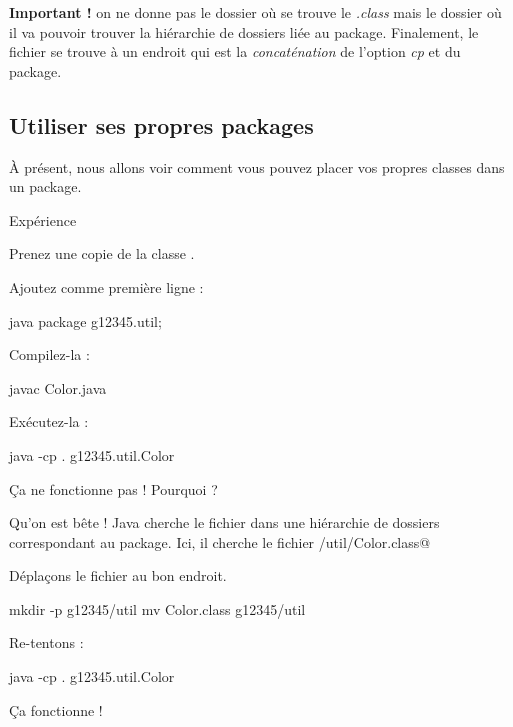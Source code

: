 \documentclass[a4paper,11pt]{article}
\begin{document}
           	 \par
        			\textbf{Important ! } on ne donne pas le dossier o\`u se trouve le \textit{.class}
			mais le dossier o\`u il va pouvoir trouver la hi\'erarchie de dossiers li\'ee au package.
			Finalement, le fichier se trouve \`a un endroit qui est la \textit{concat\'enation} de l'option \textit{cp}
			et du package.
		
            \par

	 \subsection{Utiliser ses propres packages}
		\`A pr\'esent, nous allons voir comment vous pouvez placer vos propres classes dans un package.
		
            \par
        
			
		\begin{Tutoriel}{Exp\'erience} 
         		\begin{steps}
				\item Prenez une copie de la classe \verb@Color@.	
			
				\item Ajoutez comme premi\`ere ligne :
					\begin{Code}{java}
						package g12345.util;
					\end{Code}
				\item Compilez-la : 
					\begin{Console}
						javac Color.java
					\end{Console}
				\item Ex\'ecutez-la : 
					\begin{Console}
						java -cp . g12345.util.Color
					\end{Console}
				\par
				
					\c Ca ne fonctionne pas ! Pourquoi ?
			
				 Qu'on est b\^ete ! Java cherche le fichier dans une hi\'erarchie
				de dossiers correspondant au package. Ici, il cherche le fichier
				/util/Color.class@
					
				\item D\'epla\c cons le fichier au bon endroit.
				\par
					\begin{Console}
						mkdir -p g12345/util
						mv Color.class g12345/util
					\end{Console}
				\item Re-tentons : 
					\begin{Console}
						java -cp . g12345.util.Color
					\end{Console}
				\par
				
				\c Ca fonctionne !
			
					\end{steps}
				\end{Tutoriel}
			
\end{document}
